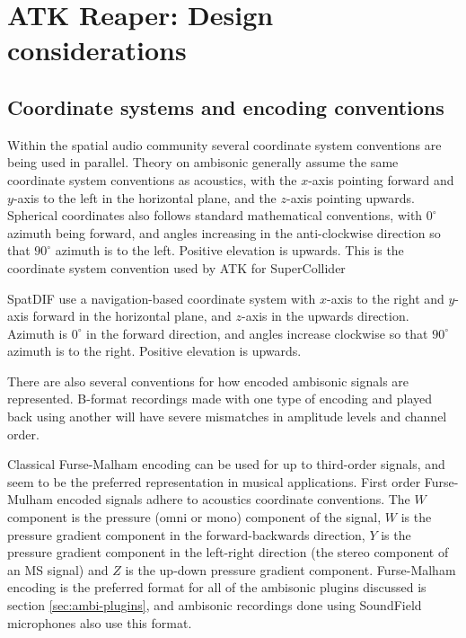 \documentclass{article}
\begin{document}
\section{ATK Reaper: Design considerations}\label{sec:design}

\subsection{Coordinate systems and encoding conventions}\label{sec:coordinate-systems}

Within the spatial audio community several coordinate system conventions are being used in parallel.
Theory on ambisonic generally assume the same coordinate system conventions as acoustics, with the $x$-axis pointing forward and $y$-axis to the left in the horizontal plane, and the $z$-axis pointing upwards. 
Spherical coordinates also follows standard mathematical conventions, with $0^{\circ}$ azimuth being forward, and angles increasing in the anti-clockwise direction so that $90^{\circ}$ azimuth is to the left.
Positive elevation is upwards.
This is the coordinate system convention used by ATK for SuperCollider

SpatDIF use a navigation-based coordinate system with $x$-axis to the right and $y$-axis forward in the horizontal plane, and $z$-axis in the upwards direction.
Azimuth is $0^{\circ}$ in the forward direction, and angles increase clockwise so that $90^{\circ}$ azimuth is to the right.
Positive elevation is upwards.

There are also several conventions for how encoded ambisonic signals are represented.
B-format recordings made with one type of encoding and played back using another will have severe mismatches in amplitude levels and channel order.

Classical Furse-Malham encoding can be used for up to third-order signals, and seem to be the preferred representation in musical applications.
First order Furse-Mulham encoded signals adhere to acoustics coordinate conventions.
The $W$ component is the pressure (omni or mono) component of the signal, $W$ is the pressure gradient component in the forward-backwards direction, $Y$ is the pressure gradient component in the left-right direction (the stereo component of an MS signal) and $Z$ is the up-down pressure gradient component.
Furse-Malham encoding is the preferred format for all of the ambisonic plugins discussed is section \ref{sec:ambi-plugins}, and ambisonic recordings done using SoundField microphones also use this format.
\end{document}

